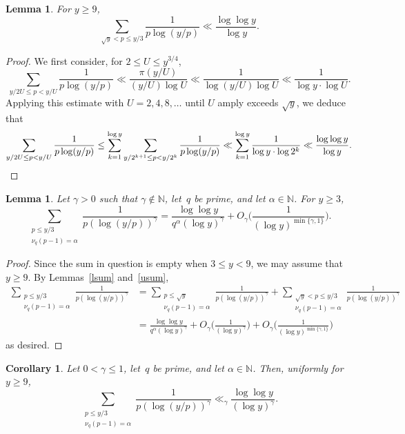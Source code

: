 \documentclass[12pt,reqno]{amsart}
\newtheorem{lemma}[theorem]{Lemma}
\newtheorem{corollary}[theorem]{Corollary}
\theoremstyle{definition}
\newcommand{\N}{{\mathbb N}}
\begin{document}
\begin{lemma} \label{sumlem}
For $y\ge 9$,
\[
\sum_{\sqrt y<p\le y/3} \frac1{p\log(y/p)} \ll \frac{\log\log y}{\log y}.
\]
\end{lemma}

\begin{proof}
We first consider, for $2\le U\le y^{3/4}$,
\[
\sum_{y/2U \le p < y/U} \frac1{p\log(y/p)} \ll \frac{\pi(y/U)}{(y/U) \log U} \ll \frac1{\log(y/U)\log U} \ll \frac1{\log y\cdot \log U}.
\]
Applying this estimate with $U=2,4,8,\dots$ until $U$ amply exceeds $\sqrt y$, we deduce that
\[
\sum_{y/2U \le p < y/U} \frac1{p\log(y/p)} \le \sum_{k=1}^{\log y} \sum_{y/2^{k+1} \le p < y/2^k} \frac1{p\log(y/p)} \ll \sum_{k=1}^{\log y} \frac1{\log y\cdot \log 2^k} \ll \frac{\log\log y}{\log y}. \qedhere
\]
\end{proof}

\begin{lemma} \label{sum}
Let $\gamma>0$ such that $\gamma\not\in\N$, let~$q$ be prime, and let $\alpha\in\N$. For $y\ge 3$,
\[
\sum_{\substack{p\le y/3 \\ \nu_q(p-1)=\alpha}} \frac1{p(\log(y/p))^\gamma} = \frac{\log\log y}{q^\alpha(\log y)^\gamma}+O_\gamma\bigg( \frac 1{(\log y)^{\min\{\gamma,1\}}} \bigg).
\]
\end{lemma}

\begin{proof}
Since the sum in question is empty when $3\le y<9$, we may assume that $y\ge9$.
By Lemmas~\ref{lsum} and~\ref{usum},
\begin{align*}
\sum_{\substack{p\le y/3\\ \nu_q(p-1)=\alpha}} \frac1{p(\log(y/p))^\gamma} &= \sum_{\substack{p\le \sqrt y\\ \nu_q(p-1)=\alpha}} \frac1{p(\log(y/p))^\gamma} + \sum_{\substack{\sqrt y<p\le y/3\\ \nu_q(p-1)=\alpha}} \frac1{p(\log(y/p))^\gamma} \\
&= \frac{\log\log y}{q^\alpha(\log y)^\gamma} + O_\gamma\bigg( \frac 1{(\log y)^\gamma}\bigg) + O_\gamma\bigg( \frac1{(\log y)^{\min\{\gamma,1\}}} \bigg)
\end{align*}
as desired.
\end{proof}

\begin{corollary} \label{sumcor}
Let $0<\gamma\le1$, let~$q$ be prime, and let $\alpha\in\N$. Then, uniformly for $y\ge 9$,
\[
\sum_{\substack{p\le y/3 \\ \nu_q(p-1)=\alpha}} \frac1{p(\log(y/p))^\gamma} \ll_\gamma \frac{\log\log y}{(\log y)^\gamma}.
\]
\end{corollary}
\end{document}
